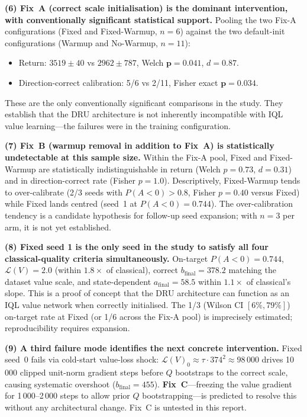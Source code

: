 \documentclass[10pt,a4paper]{article}
\begin{document}
\textbf{(6) Fix~A (correct scale initialisation) is the dominant intervention,
with conventionally significant statistical support.}
Pooling the two Fix-A configurations (Fixed and Fixed-Warmup, $n=6$) against
the two default-init configurations (Warmup and No-Warmup, $n=11$):

\begin{itemize}
  \item Return: $3519\pm40$ vs $2962\pm787$, Welch $\mathbf{p=0.041}$,
        $d=0.87$.
  \item Direction-correct calibration: 5/6 vs 2/11, Fisher exact
        $\mathbf{p=0.034}$.
\end{itemize}

These are the only conventionally significant comparisons in the study.
They establish that the DRU architecture is not inherently incompatible with
IQL value learning---the failures were in the training configuration.

\textbf{(7) Fix~B (warmup removal in addition to Fix~A) is statistically
undetectable at this sample size.}
Within the Fix-A pool, Fixed and Fixed-Warmup are statistically
indistinguishable in return (Welch $p=0.73$, $d=0.31$) and in direction-correct
rate (Fisher $p=1.0$).
Descriptively, Fixed-Warmup tends to over-calibrate (2/3 seeds with
$P(A{<}0){>}0.8$, Fisher $p=0.40$ versus Fixed) while Fixed lands centred
(seed~1 at $P(A{<}0){=}0.744$).
The over-calibration tendency is a candidate hypothesis for follow-up seed
expansion; with $n=3$ per arm, it is not yet established.

\textbf{(8) Fixed seed 1 is the only seed in the study to satisfy all four
classical-quality criteria simultaneously.}
On-target $P(A{<}0)=0.744$, $\mathcal{L}(V)=2.0$ (within $1.8\times$ of
classical), correct $b_\text{final}=378.2$ matching the dataset value scale,
and state-dependent $a_\text{final}=58.5$ within $1.1\times$ of classical's
slope. This is a proof of concept that the DRU architecture can function as
an IQL value network when correctly initialised. The 1/3 (Wilson CI
$[6\%,79\%]$) on-target rate at Fixed (or 1/6 across the Fix-A pool) is
imprecisely estimated; reproducibility requires expansion.

\textbf{(9) A third failure mode identifies the next concrete intervention.}
Fixed seed~0 fails via cold-start value-loss shock:
$\mathcal{L}(V)_0\approx\tau\cdot374^2\approx98\,000$ drives 10\,000
clipped unit-norm gradient steps before $Q$ bootstraps to the correct scale,
causing systematic overshoot ($b_\text{final}=455$).
\textbf{Fix~C}---freezing the value gradient for 1\,000--2\,000 steps to
allow prior $Q$ bootstrapping---is predicted to resolve this without any
architectural change. Fix~C is untested in this report.
\end{document}
